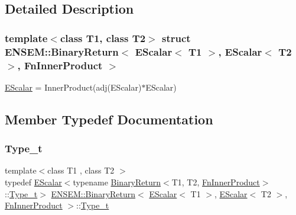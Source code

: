 \subsection{Detailed Description}
\subsubsection*{template$<$class T1, class T2$>$\newline
struct E\+N\+S\+E\+M\+::\+Binary\+Return$<$ E\+Scalar$<$ T1 $>$, E\+Scalar$<$ T2 $>$, Fn\+Inner\+Product $>$}

\mbox{\hyperlink{classENSEM_1_1EScalar}{E\+Scalar}} = Inner\+Product(adj(\+E\+Scalar)$\ast$\+E\+Scalar) 

\subsection{Member Typedef Documentation}
\mbox{\label{structENSEM_1_1BinaryReturn_3_01EScalar_3_01T1_01_4_00_01EScalar_3_01T2_01_4_00_01FnInnerProduct_01_4_a873972feeb93fe2dbe766749aba076f1}} 
\subsubsection{\texorpdfstring{Type\_t}{Type\_t}\hspace{0.1cm}{\footnotesize\ttfamily [1/3]}}
{\footnotesize\ttfamily template$<$class T1 , class T2 $>$ \\
typedef \mbox{\hyperlink{classENSEM_1_1EScalar}{E\+Scalar}}$<$typename \mbox{\hyperlink{structENSEM_1_1BinaryReturn}{Binary\+Return}}$<$T1, T2, \mbox{\hyperlink{structENSEM_1_1FnInnerProduct}{Fn\+Inner\+Product}}$>$\+::\mbox{\hyperlink{structENSEM_1_1BinaryReturn_3_01EScalar_3_01T1_01_4_00_01EScalar_3_01T2_01_4_00_01FnInnerProduct_01_4_a873972feeb93fe2dbe766749aba076f1}{Type\+\_\+t}}$>$ \mbox{\hyperlink{structENSEM_1_1BinaryReturn}{E\+N\+S\+E\+M\+::\+Binary\+Return}}$<$ \mbox{\hyperlink{classENSEM_1_1EScalar}{E\+Scalar}}$<$ T1 $>$, \mbox{\hyperlink{classENSEM_1_1EScalar}{E\+Scalar}}$<$ T2 $>$, \mbox{\hyperlink{structENSEM_1_1FnInnerProduct}{Fn\+Inner\+Product}} $>$\+::\mbox{\hyperlink{structENSEM_1_1BinaryReturn_3_01EScalar_3_01T1_01_4_00_01EScalar_3_01T2_01_4_00_01FnInnerProduct_01_4_a873972feeb93fe2dbe766749aba076f1}{Type\+\_\+t}}}

